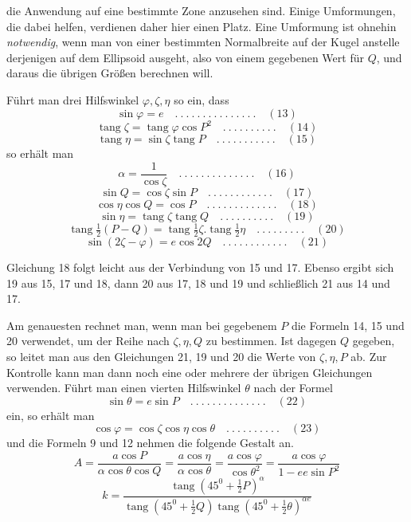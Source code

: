 %
die Anwendung auf eine bestimmte Zone anzusehen sind. Einige Umformungen, die dabei helfen, verdienen daher hier einen Platz. Eine Umformung ist ohnehin \textit{notwendig}, wenn man von einer bestimmten Normalbreite auf der Kugel anstelle derjenigen auf dem Ellipsoid ausgeht, also von einem gegebenen Wert für \(Q\), und daraus die übrigen Größen berechnen will.

Führt man drei Hilfswinkel \(\varphi,\zeta,\eta\) so ein, dass
\[
\sin\varphi=e \quad .\ .\ .\ .\ .\ .\ .\ .\ .\ .\ .\ .\ .\ .\ .\quad(13)
\]
\[
\operatorname{tang}\zeta=\operatorname{tang}\varphi\cos P^2 \quad .\ .\ .\ .\ .\ .\ .\ .\ .\ .\quad(14)
\]
\[
\operatorname{tang}\eta=\sin\zeta\operatorname{tang}P \quad .\ .\ .\ .\ .\ .\ .\ .\ .\ .\ .\quad(15)
\]
so erhält man
\[
\alpha=\frac{1}{\cos\zeta} \quad .\ .\ .\ .\ .\ .\ .\ .\ .\ .\ .\ .\ .\ .\quad(16)
\]
\[
\sin Q=\cos\zeta\sin P \quad .\ .\ .\ .\ .\ .\ .\ .\ .\ .\ .\ .\quad(17)
\]
\[
\cos\eta\cos Q=\cos P \quad .\ .\ .\ .\ .\ .\ .\ .\ .\ .\ .\ .\ .\quad(18)
\]
\[
\sin\eta=\operatorname{tang}\zeta\operatorname{tang}Q \quad .\ .\ .\ .\ .\ .\ .\ .\ .\ .\quad(19)
\]
\[
\operatorname{tang}\tfrac{1}{2}(P-Q)=\operatorname{tang}\tfrac{1}{2}\zeta\mathord{.}\operatorname{tang}\tfrac{1}{2}\eta \quad .\ .\ .\ .\ .\ .\ .\ .\ .\quad(20)
\]
\[
\sin(2\zeta-\varphi)=e\cos2Q \quad .\ .\ .\ .\ .\ .\ .\ .\ .\ .\ .\ .\quad(21)
\]

Gleichung 18 folgt leicht aus der Verbindung von 15 und 17. Ebenso ergibt sich 19 aus 15, 17 und 18, dann 20 aus 17, 18 und 19 und schließlich 21 aus 14 und 17.

Am genauesten rechnet man, wenn man bei gegebenem \(P\) die Formeln 14, 15 und 20 verwendet, um der Reihe nach \(\zeta,\eta,Q\) zu bestimmen. Ist dagegen \(Q\) gegeben, so leitet man aus den Gleichungen 21, 19 und 20 die Werte von \(\zeta,\eta,P\) ab. Zur Kontrolle kann man dann noch eine oder mehrere der übrigen Gleichungen verwenden. Führt man einen vierten Hilfswinkel \(\theta\) nach der Formel
\[
\sin\theta=e\sin P \quad .\ .\ .\ .\ .\ .\ .\ .\ .\ .\ .\ .\ .\ .\quad(22)
\]
ein, so erhält man
\[
\cos\varphi=\cos\zeta\cos\eta\cos\theta \quad .\ .\ .\ .\ .\ .\ .\ .\ .\ .\quad(23)
\]
und die Formeln 9 und 12 nehmen die folgende Gestalt an.
\[
A=\frac{a\cos P}{\alpha\cos\theta\cos Q}=\frac{a\cos\eta}{\alpha\cos\theta}=\frac{a\cos\varphi}{\cos\theta^2}=\frac{a\cos\varphi}{1-ee\sin P^2}
\]
\[
k=\frac{\operatorname{tang}(45^0+\frac{1}{2}P)^\alpha}{\operatorname{tang}(45^0+\frac{1}{2}Q)\operatorname{tang}(45^0+\frac{1}{2}\theta)^{\alpha e}}
\]
